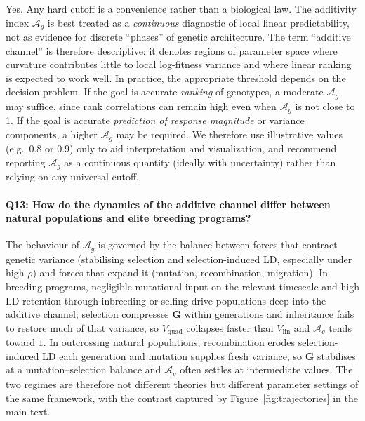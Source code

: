 \documentclass[9pt,twocolumn,twoside,lineno]{gsajnl}
\newcommand{\mat}[1]{\mathbf{#1}}
\newcommand{\Ag}{\ensuremath{\mathcal{A}_{g}}\xspace}
\newcommand{\Vlin}{\ensuremath{V_{\text{lin}}}\xspace}
\newcommand{\Vquad}{\ensuremath{V_{\text{quad}}}\xspace}
\begin{document}
Yes. Any hard cutoff is a convenience rather than a biological law. The additivity index $\mathcal{A}_g$ is best treated as a \emph{continuous} diagnostic of local linear predictability, not as evidence for discrete ``phases'' of genetic architecture. The term ``additive channel'' is therefore descriptive: it denotes regions of parameter space where curvature contributes little to local log-fitness variance and where linear ranking is expected to work well. In practice, the appropriate threshold depends on the decision problem. If the goal is accurate \emph{ranking} of genotypes, a moderate $\mathcal{A}_g$ may suffice, since rank correlations can remain high even when $\mathcal{A}_g$ is not close to 1. If the goal is accurate \emph{prediction of response magnitude} or variance components, a higher $\mathcal{A}_g$ may be required. We therefore use illustrative values (e.g.\ $0.8$ or $0.9$) only to aid interpretation and visualization, and recommend reporting $\mathcal{A}_g$ as a continuous quantity (ideally with uncertainty) rather than relying on any universal cutoff.

\paragraph{Q13: How do the dynamics of the additive channel differ between natural populations and elite breeding programs?}
The behaviour of \Ag is governed by the balance between forces that contract genetic variance (stabilising selection and selection-induced LD, especially under high $\rho$) and forces that expand it (mutation, recombination, migration). In breeding programs, negligible mutational input on the relevant timescale and high LD retention through inbreeding or selfing drive populations deep into the additive channel; selection compresses $\mat{G}$ within generations and inheritance fails to restore much of that variance, so $\Vquad$ collapses faster than $\Vlin$ and \Ag tends toward $1$. In outcrossing natural populations, recombination erodes selection-induced LD each generation and mutation supplies fresh variance, so $\mat{G}$ stabilises at a mutation--selection balance and \Ag often settles at intermediate values. The two regimes are therefore not different theories but different parameter settings of the same framework, with the contrast captured by Figure~\ref{fig:trajectories} in the main text.
\end{document}
